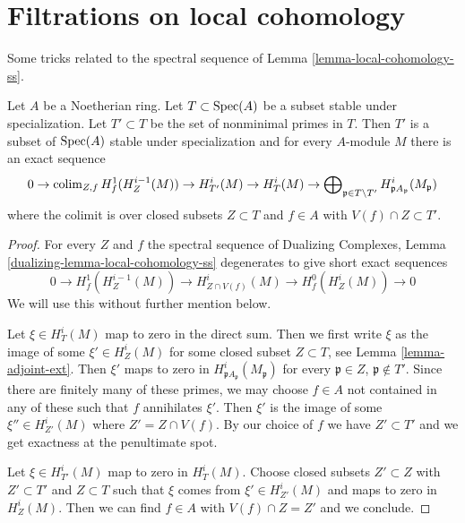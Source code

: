 \section{Filtrations on local cohomology}
\label{section-filter-local-cohomology}

\noindent
Some tricks related to the spectral sequence of
Lemma \ref{lemma-local-cohomology-ss}.

\begin{lemma}
\label{lemma-filter-local-cohomology}
Let $A$ be a Noetherian ring. Let $T \subset \mathop{\mathrm{Spec}}(A)$
be a subset stable under specialization. Let $T' \subset T$ be
the set of nonminimal primes in $T$. Then $T'$
is a subset of $\mathop{\mathrm{Spec}}(A)$ stable under specialization
and for every $A$-module $M$ there is an exact sequence
$$
0 \to
\mathop{\mathrm{colim}}\nolimits_{Z, f} H^1_f(H^{i - 1}_Z(M)) \to
H^i_{T'}(M) \to H^i_T(M) \to
\bigoplus\nolimits_{\mathfrak p \in T \setminus T'}
H^i_{\mathfrak p A_\mathfrak p}(M_\mathfrak p)
$$
where the colimit is over closed subsets $Z \subset T$
and $f \in A$ with $V(f) \cap Z \subset T'$.
\end{lemma}

\begin{proof}
For every $Z$ and $f$ the spectral sequence of
Dualizing Complexes, Lemma \ref{dualizing-lemma-local-cohomology-ss}
degenerates to give short exact sequences
$$
0 \to H^1_f(H^{i - 1}_Z(M)) \to
H^i_{Z \cap V(f)}(M) \to H^0_f(H^i_Z(M)) \to 0
$$
We will use this without further mention below.

\medskip\noindent
Let $\xi \in H^i_T(M)$ map to zero in the direct sum.
Then we first write $\xi$ as the image of some $\xi' \in H^i_Z(M)$
for some closed subset $Z \subset T$, see Lemma \ref{lemma-adjoint-ext}.
Then $\xi'$ maps to zero in $H^i_{\mathfrak p A_\mathfrak p}(M_\mathfrak p)$
for every $\mathfrak p \in Z$, $\mathfrak p \not \in T'$.
Since there are finitely many of these primes,
we may choose $f \in A$ not contained in any of these
such that $f$ annihilates $\xi'$. Then $\xi'$
is the image of some $\xi'' \in H^i_{Z'}(M)$
where $Z' = Z \cap V(f)$. By our choice of $f$ we have
$Z' \subset T'$ and we get exactness at the penultimate spot.

\medskip\noindent
Let $\xi \in H^i_{T'}(M)$ map to zero in $H^i_T(M)$.
Choose closed subsets $Z' \subset Z$ with $Z' \subset T'$
and $Z \subset T$ such that $\xi$ comes from $\xi' \in H^i_{Z'}(M)$
and maps to zero in $H^i_Z(M)$. Then we can find $f \in A$
with $V(f) \cap Z = Z'$ and we conclude.
\end{proof}

